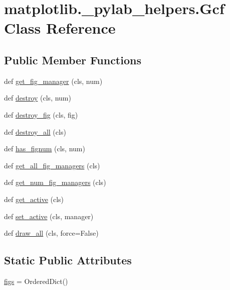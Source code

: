 \hypertarget{classmatplotlib_1_1__pylab__helpers_1_1Gcf}{}\section{matplotlib.\+\_\+pylab\+\_\+helpers.\+Gcf Class Reference}
\label{classmatplotlib_1_1__pylab__helpers_1_1Gcf}
\subsection*{Public Member Functions}
\begin{DoxyCompactItemize}
\item 
def \hyperlink{classmatplotlib_1_1__pylab__helpers_1_1Gcf_ab7305abada9a0b1b90b3372fcf8ac252}{get\+\_\+fig\+\_\+manager} (cls, num)
\item 
def \hyperlink{classmatplotlib_1_1__pylab__helpers_1_1Gcf_a86f75e007ad25fdd27d8b9d653fbbc68}{destroy} (cls, num)
\item 
def \hyperlink{classmatplotlib_1_1__pylab__helpers_1_1Gcf_abad6184840428b5f61e4189e31b7afca}{destroy\+\_\+fig} (cls, fig)
\item 
def \hyperlink{classmatplotlib_1_1__pylab__helpers_1_1Gcf_a905219f103cc91dfde091ed3646a6232}{destroy\+\_\+all} (cls)
\item 
def \hyperlink{classmatplotlib_1_1__pylab__helpers_1_1Gcf_a83e22aaf970c30ceace612df6d71627d}{has\+\_\+fignum} (cls, num)
\item 
def \hyperlink{classmatplotlib_1_1__pylab__helpers_1_1Gcf_ad92db96f2a96a72fb6c1c50e9463175e}{get\+\_\+all\+\_\+fig\+\_\+managers} (cls)
\item 
def \hyperlink{classmatplotlib_1_1__pylab__helpers_1_1Gcf_adbf95150f1ec9e1e7e627c15d6e70d8f}{get\+\_\+num\+\_\+fig\+\_\+managers} (cls)
\item 
def \hyperlink{classmatplotlib_1_1__pylab__helpers_1_1Gcf_a0e47e4eb6aeaafb74964663be2006896}{get\+\_\+active} (cls)
\item 
def \hyperlink{classmatplotlib_1_1__pylab__helpers_1_1Gcf_aef2f252452714001e349f445885b0716}{set\+\_\+active} (cls, manager)
\item 
def \hyperlink{classmatplotlib_1_1__pylab__helpers_1_1Gcf_acbced6083e36a464b12764c3785959b7}{draw\+\_\+all} (cls, force=False)
\end{DoxyCompactItemize}
\subsection*{Static Public Attributes}
\begin{DoxyCompactItemize}
\item 
\hyperlink{classmatplotlib_1_1__pylab__helpers_1_1Gcf_ac1d16159d761b872a4840cb20b1a591d}{figs} = Ordered\+Dict()
\end{DoxyCompactItemize}


